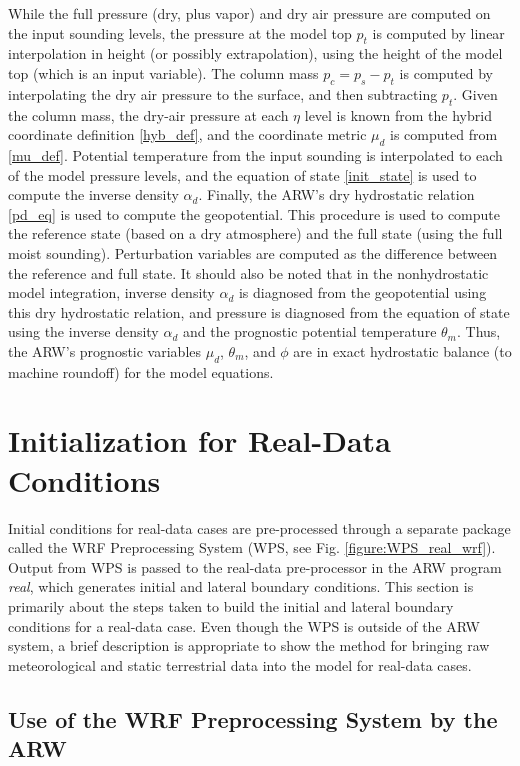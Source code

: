 While the full pressure (dry, plus vapor) and dry air pressure are
computed on the input sounding levels, the pressure at the model top $p_{t}$
is computed by linear interpolation in height (or possibly
extrapolation), using the height of the model top (which is an input variable).
The column mass $p_c=p_s-p_t$ is computed by interpolating the dry air
pressure to the surface, and then subtracting $p_{t}$.  Given the
column mass, the dry-air pressure at each $\eta$ level is known from the
hybrid coordinate definition \eqref{hyb_def}, and the coordinate metric 
$\mu_d$ is computed from \eqref{mu_def}.
Potential temperature from the input sounding is interpolated to
each of the model pressure levels, and the equation of state
\eqref{init_state} is used to compute the inverse density 
$\alpha_d$.  Finally, the 
ARW's dry hydrostatic relation \eqref{pd_eq}
is used to compute the geopotential.  This procedure is used to compute
the reference state (based on a dry atmosphere) and the full state
(using the full moist sounding).  Perturbation variables are
computed as the difference between the reference and full state.  It
should also be noted that in the nonhydrostatic model integration,
inverse density $\alpha_d$ is diagnosed from the geopotential using
this dry hydrostatic relation, and pressure is diagnosed from the equation
of state using the inverse density $\alpha_d$ and the prognostic potential
temperature $\theta_m$.  Thus, the ARW's prognostic variables $\mu_d$,
$\theta_m$, and $\phi$ are in exact hydrostatic balance (to machine roundoff) 
for the model equations.

\section{Initialization for Real-Data Conditions}
Initial conditions for real-data cases are pre-processed through a separate 
package called the WRF Preprocessing System (WPS, see Fig. \ref{figure:WPS_real_wrf}).  
Output from WPS is passed to the 
real-data pre-processor in the ARW program {\it real}, which generates initial and lateral boundary
conditions.  This section is primarily about the steps taken to build the
initial and lateral boundary conditions for a real-data case.  Even though the
WPS is outside of the ARW system, a brief description is appropriate to show the 
method for bringing raw meteorological and static terrestrial data into the model
for real-data cases.

\subsection{Use of the WRF Preprocessing System by the ARW}

